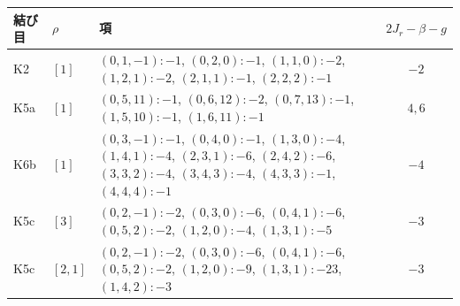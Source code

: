 \begin{tabular}{llp{9.5cm}c}
\toprule
結び目 & $\rho$ & 項 & $2J_r-\beta-g$ \\
\midrule
K2 & $[1]$ & $(0,1,-1)\!:-1$, $(0,2,0)\!:-1$, $(1,1,0)\!:-2$, $(1,2,1)\!:-2$, $(2,1,1)\!:-1$, $(2,2,2)\!:-1$ & $-2$ \\
K5a & $[1]$ & $(0,5,11)\!:-1$, $(0,6,12)\!:-2$, $(0,7,13)\!:-1$, $(1,5,10)\!:-1$, $(1,6,11)\!:-1$ & $4, 6$ \\
K6b & $[1]$ & $(0,3,-1)\!:-1$, $(0,4,0)\!:-1$, $(1,3,0)\!:-4$, $(1,4,1)\!:-4$, $(2,3,1)\!:-6$, $(2,4,2)\!:-6$, $(3,3,2)\!:-4$, $(3,4,3)\!:-4$, $(4,3,3)\!:-1$, $(4,4,4)\!:-1$ & $-4$ \\
K5c & $[3]$ & $(0,2,-1)\!:-2$, $(0,3,0)\!:-6$, $(0,4,1)\!:-6$, $(0,5,2)\!:-2$, $(1,2,0)\!:-4$, $(1,3,1)\!:-5$ & $-3$ \\
K5c & $[2,1]$ & $(0,2,-1)\!:-2$, $(0,3,0)\!:-6$, $(0,4,1)\!:-6$, $(0,5,2)\!:-2$, $(1,2,0)\!:-9$, $(1,3,1)\!:-23$, $(1,4,2)\!:-3$ & $-3$ \\
\bottomrule
\end{tabular}
